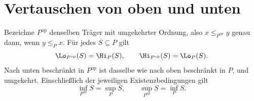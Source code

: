 \section{Vertauschen von oben und unten}

\begin{theorem}
\label{b13guide:thm:dual}
Bezeichne $P^{\mathrm{op}}$ denselben Träger mit umgekehrter Ordnung,
also $x\leq_{P^{\mathrm{op}}}y$ genau dann, wenn $y\leq_P x$.
Für jedes $S\subseteq P$ gilt
\[
 \Lo_{P^{\mathrm{op}}}(S)=\Hi_P(S),\qquad
 \Hi_{P^{\mathrm{op}}}(S)=\Lo_P(S).
\]
Nach unten beschränkt in $P^{\mathrm{op}}$ ist dasselbe wie
nach oben beschränkt in $P$, und umgekehrt.
Einschließlich der jeweiligen Existenzbedingungen gilt
\[
 \inf_{P^{\mathrm{op}}}S=\sup_P S,\qquad
 \sup_{P^{\mathrm{op}}}S=\inf_P S.
\]
\end{theorem}
